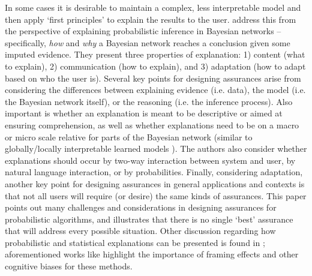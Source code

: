In some cases it is desirable to maintain a complex, less interpretable model and then apply `first principles' to explain the results to the user. \citet{Lacave2002-cu} address this from the perspective of explaining probabilistic inference in Bayesian networks -- specifically, \emph{how} and \emph{why} a Bayesian network reaches a conclusion given some imputed evidence. 
They present three properties of explanation: 1) content (what to explain), 2) communication (how to explain), and 3) adaptation (how to adapt based on who the user is). %
Several key points for designing assurances arise from considering the differences between explaining evidence (i.e. data), the model (i.e. the Bayesian network itself), or the reasoning (i.e. the inference process). 
Also important is whether an explanation is meant to be descriptive or aimed at ensuring comprehension, as well as whether explanations need to be on a macro or micro scale relative for parts of the Bayesian network (similar to globally/locally interpretable learned models \citeauthor{Ruping2006-xj}). 
The authors also consider whether explanations should occur by two-way interaction between system and user, by natural language interaction, or by probabilities. Finally, considering adaptation, another key point for designing assurances in general applications and contexts is that not all users will require (or desire) the same kinds of assurances. This paper points out many challenges and considerations in designing assurances for probabilistic algorithms, and illustrates that %
there is no single `best' assurance that will address every possible situation. 
Other discussion regarding how probabilistic and statistical explanations can be presented is found in \cite{Rouse1986-dz,Wallace2001-fm,Kuhn1997-qc,Lomas2012-ie,Swartout1983-ko}; 
aforementioned works like \cite{Kuhn1997-qc} highlight the importance of framing effects and other cognitive biases for these methods. 

